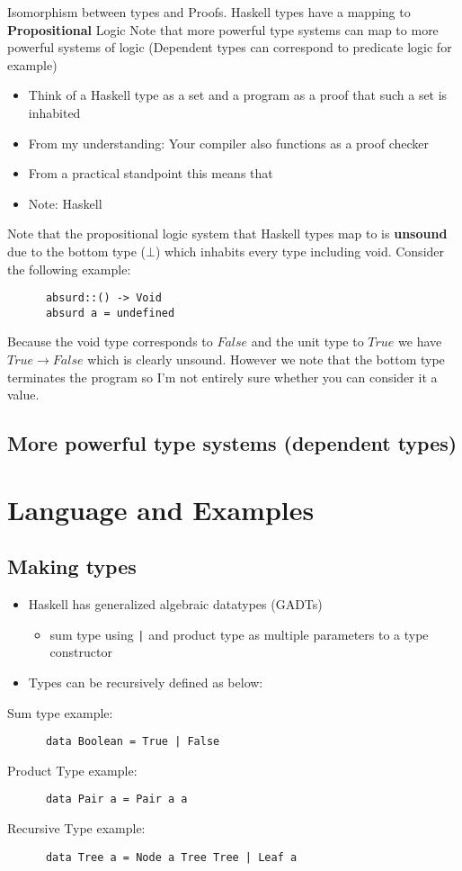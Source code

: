 \documentclass{article}
\begin{document}
Isomorphism between types and Proofs. Haskell types have a mapping to \textbf{Propositional} Logic
Note that more powerful type systems can map to more powerful systems of logic (Dependent types can
correspond to predicate logic for example)
\begin{itemize}
  \item Think of a Haskell type as a set and a program as a proof that such a set is inhabited
  \item From my understanding: Your compiler also functions as a proof checker
  \item From a practical standpoint this means that 
  \item Note: Haskell
\end{itemize}
     Note that the propositional logic system that Haskell types map to is \textbf{unsound}
     due to the bottom type ($\bot$) which inhabits every type including void. Consider the
     following example:
    \begin{verbatim}
      absurd::() -> Void
      absurd a = undefined
    \end{verbatim}
      Because the void type corresponds to $False$ and the unit type to $True$
      we have $True \rightarrow False$ which is clearly unsound. However we note
      that the bottom type terminates the program so I'm not entirely sure whether
      you can consider it a value.

\subsection{More powerful type systems (dependent types)}

\section{Language and Examples}

\subsection{Making types}
\begin{itemize}
  \item  Haskell has generalized algebraic datatypes (GADTs)
    \begin{itemize}
      \item sum type using \verb.|. and product type as multiple parameters
            to a type constructor
   \end{itemize}
 \item Types can be recursively defined as below:
\end{itemize}
Sum type example:
    \begin{verbatim}
      data Boolean = True | False
    \end{verbatim}
Product Type example:
    \begin{verbatim}
      data Pair a = Pair a a
    \end{verbatim}
Recursive Type example:
    \begin{verbatim}
      data Tree a = Node a Tree Tree | Leaf a
    \end{verbatim}
\end{document}
